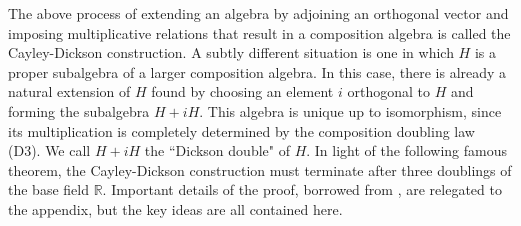 \documentclass[10pt]{amsart}
\newcommand{\R}{\mathbb{R}}
\begin{document}


\begin{center}
\end{center}



The above process of extending an algebra by adjoining an orthogonal vector and imposing multiplicative relations that result in a composition algebra is called the Cayley-Dickson construction.  A subtly different situation is one in which $H$ is a proper subalgebra of a larger composition algebra.  In this case, there is already a natural extension of $H$ found by choosing an element $i$ orthogonal to $H$ and forming the subalgebra $H+iH$.  This algebra is unique up to isomorphism, since its multiplication is completely determined by the composition doubling law (D3).  We call $H + iH$ the ``Dickson double" of $H$.  In light of the following famous theorem, the Cayley-Dickson construction must terminate after three doublings of the base field $\R$.  Important details of the proof, borrowed from \cite{Co03}, are relegated to the appendix, but the key ideas are all contained here.
\end{document}
